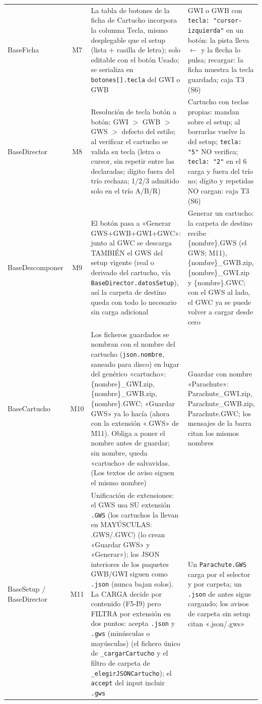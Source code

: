 \begin{xltabular}{\textwidth}{l c >{\RaggedRight\arraybackslash}X >{\RaggedRight\arraybackslash}X}
	BaseFicha & M7 & La tabla de botones de la ficha de Cartucho incorpora la columna Tecla, mismo desplegable que el setup (lista + casilla de letra); solo editable con el botón Usado; se serializa en \texttt{botones[].tecla} del GWI o GWB & GWI o GWB con \texttt{tecla: "cursor-izquierda"} en un botón: la pista lleva $\leftarrow$ y la flecha lo pulsa; recargar: la ficha muestra la tecla guardada; caja T3 (S6) \\
	
	BaseDirector & M8 & Resolución de tecla botón a botón: GWI $>$ GWB $>$ GWS $>$ defecto del estilo; al verificar el cartucho se valida su tecla (letra o cursor, sin repetir entre las declaradas; dígito fuera del trío rechaza; 1/2/3 admitido solo en el trío A/B/R) & Cartucho con teclas propias: mandan sobre el setup; al borrarlas vuelve la del setup; \texttt{tecla: "5"} NO verifica; \texttt{tecla: "2"} en el 6 carga y fuera del trío no; dígito y repetidas NO cargan: caja T3 (S6) \\
	
	BaseDescomponer & M9 & El botón pasa a «Generar GWS+GWB+GWI+GWC»: junto al GWC se descarga TAMBIÉN el GWS del setup vigente (real o derivado del cartucho, vía \texttt{BaseDirector.datosSetup}), así la carpeta de destino queda con todo lo necesario sin carga adicional & Generar un cartucho: la carpeta de destino recibe \{nombre\}.GWS (el GWS; M11), \{nombre\}_GWB.zip, \{nombre\}_GWI.zip y \{nombre\}.GWC; con el GWS al lado, el GWC ya se puede volver a cargar desde cero \\
	
	BaseCartucho & M10 & Los ficheros guardados se nombran con el nombre del cartucho (\texttt{json.nombre}, saneado para disco) en lugar del genérico «cartucho»: \{nombre\}_GWI.zip, \{nombre\}_GWB.zip, \{nombre\}.GWC; «Guardar GWS» ya lo hacía (ahora con la extensión «.GWS» de M11). Obliga a poner el nombre antes de guardar; sin nombre, queda «cartucho» de salvavidas. (Los textos de aviso siguen el mismo nombre) & Guardar con nombre «Parachute»: Parachute\_GWI.zip, Parachute\_GWB.zip, Parachute.GWC; los mensajes de la barra citan los mismos nombres \\
	
	BaseSetup / BaseDirector & M11 & Unificación de extensiones: el GWS usa SU extensión \texttt{.GWS} (los cartuchos la llevan en MAYÚSCULAS: .GWS/.GWC) (lo crean «Guardar GWS» y «Generar»); los JSON interiores de los paquetes GWB/GWI siguen como \texttt{.json} (nunca bajan solos). La CARGA decide por contenido (F5-I9) pero FILTRA por extensión en dos puntos: acepta \texttt{.json} y \texttt{.gws} (minúsculas o mayúsculas) (el fichero único de \texttt{\_cargarCartucho} y el filtro de carpeta de \texttt{\_elegirJSONCartucho}); el \texttt{accept} del input incluir \texttt{.gws} & Un \texttt{Parachute.GWS} carga por el selector y por carpeta; un \texttt{.json} de antes sigue cargando; los avisos de carpeta sin setup citan «.json/.gws» \\
	
	\bottomrule
\end{xltabular}


